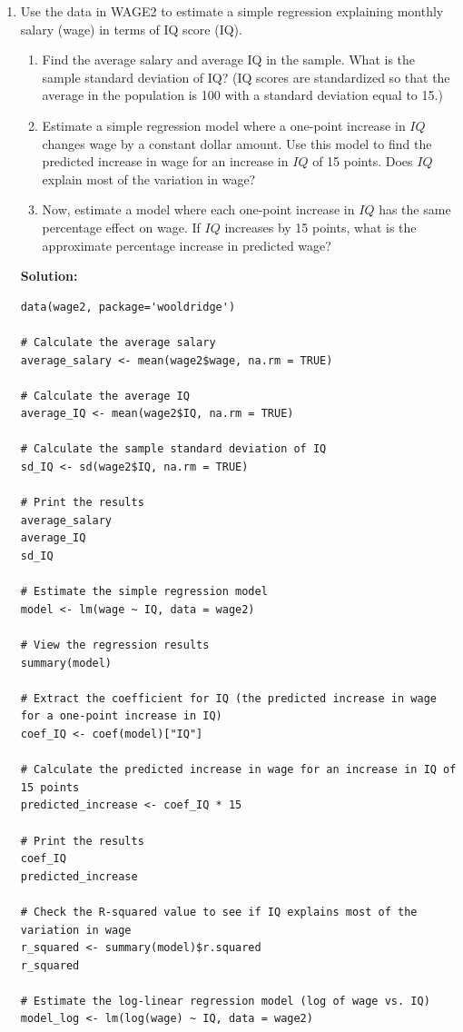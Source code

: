 \documentclass[12pt]{article}
\begin{document}
\begin{enumerate}
\item Use the data in WAGE2 to estimate a simple regression explaining monthly salary (wage) in terms of IQ score (IQ).
\begin{enumerate}
    \item Find the average salary and average IQ in the sample. What is the sample standard deviation of IQ? (IQ scores are standardized so that the average in the population is 100 with a standard deviation equal to 15.)
    \item Estimate a simple regression model where a one-point increase in $I Q$ changes wage by a constant dollar amount. Use this model to find the predicted increase in wage for an increase in $I Q$ of 15 points. Does $I Q$ explain most of the variation in wage?
    \item Now, estimate a model where each one-point increase in $I Q$ has the same percentage effect on wage. If $I Q$ increases by 15 points, what is the approximate percentage increase in predicted wage?
\end{enumerate}

{\color{blue}
\noindent \textbf{Solution:}

\begin{lstlisting}
data(wage2, package='wooldridge')

# Calculate the average salary
average_salary <- mean(wage2$wage, na.rm = TRUE)

# Calculate the average IQ
average_IQ <- mean(wage2$IQ, na.rm = TRUE)

# Calculate the sample standard deviation of IQ
sd_IQ <- sd(wage2$IQ, na.rm = TRUE)

# Print the results
average_salary
average_IQ
sd_IQ

# Estimate the simple regression model
model <- lm(wage ~ IQ, data = wage2)

# View the regression results
summary(model)

# Extract the coefficient for IQ (the predicted increase in wage for a one-point increase in IQ)
coef_IQ <- coef(model)["IQ"]

# Calculate the predicted increase in wage for an increase in IQ of 15 points
predicted_increase <- coef_IQ * 15

# Print the results
coef_IQ
predicted_increase

# Check the R-squared value to see if IQ explains most of the variation in wage
r_squared <- summary(model)$r.squared
r_squared

# Estimate the log-linear regression model (log of wage vs. IQ)
model_log <- lm(log(wage) ~ IQ, data = wage2)


\end{lstlisting}}
\end{enumerate}
\end{document}
